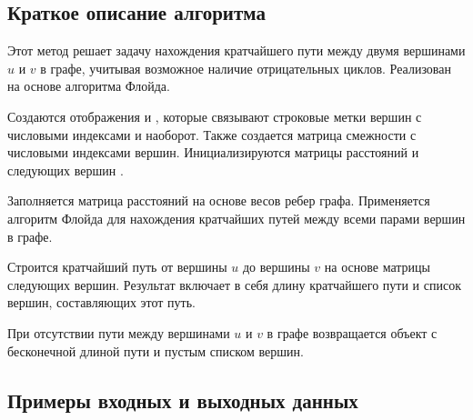 \subsection{Краткое описание алгоритма}
Этот метод решает задачу нахождения кратчайшего пути между двумя вершинами $u$ и $v$ в графе,
учитывая возможное наличие отрицательных циклов. Реализован на основе алгоритма Флойда.

Создаются отображения  и , которые связывают строковые метки вершин
с числовыми индексами и наоборот. Также создается матрица смежности  с числовыми
индексами вершин. Инициализируются матрицы расстояний  и следующих вершин .

Заполняется матрица расстояний на основе весов ребер графа. Применяется алгоритм Флойда для нахождения
кратчайших путей между всеми парами вершин в графе.

Строится кратчайший путь от вершины $u$ до вершины $v$ на основе матрицы следующих вершин. Результат
включает в себя длину кратчайшего пути и список вершин, составляющих этот путь.

При отсутствии пути между вершинами $u$ и $v$ в графе возвращается объект с бесконечной длиной пути и
пустым списком вершин.

\subsection{Примеры входных и выходных данных}

